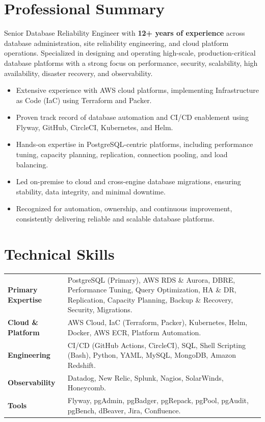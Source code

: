 \documentclass[10pt,a4paper]{article}
\begin{document}
\section{Professional Summary}
Senior Database Reliability Engineer with \textbf{12+ years of experience} across database administration, site reliability engineering, and cloud platform operations. Specialized in designing and operating high-scale, production-critical database platforms with a strong focus on performance, security, scalability, high availability, disaster recovery, and observability.
\begin{itemize}[leftmargin=*, noitemsep, topsep=2pt]
    \item Extensive experience with AWS cloud platforms, implementing Infrastructure as Code (IaC) using Terraform and Packer.
    \item Proven track record of database automation and CI/CD enablement using Flyway, GitHub, CircleCI, Kubernetes, and Helm.
    \item Hands-on expertise in PostgreSQL-centric platforms, including performance tuning, capacity planning, replication, connection pooling, and load balancing.
    \item Led on-premise to cloud and cross-engine database migrations, ensuring stability, data integrity, and minimal downtime.
    \item Recognized for automation, ownership, and continuous improvement, consistently delivering reliable and scalable database platforms.
\end{itemize}

\section{Technical Skills}
\begin{tabularx}{\textwidth}{@{}l X@{}}
    \textbf{\color{primary}Primary Expertise} & PostgreSQL (Primary), AWS RDS \& Aurora, DBRE, Performance Tuning, Query Optimization, HA \& DR, Replication, Capacity Planning, Backup \& Recovery, Security, Migrations. \\
    \textbf{\color{primary}Cloud \& Platform} & AWS Cloud, IaC (Terraform, Packer), Kubernetes, Helm, Docker, AWS ECR, Platform Automation. \\
    \textbf{\color{primary}Engineering} & CI/CD (GitHub Actions, CircleCI), SQL, Shell Scripting (Bash), Python, YAML, MySQL, MongoDB, Amazon Redshift. \\
    \textbf{\color{primary}Observability} & Datadog, New Relic, Splunk, Nagios, SolarWinds, Honeycomb. \\
    \textbf{\color{primary}Tools} & Flyway, pgAdmin, pgBadger, pgRepack, pgPool, pgAudit, pgBench, dBeaver, Jira, Confluence. \\
\end{tabularx}
\end{document}
